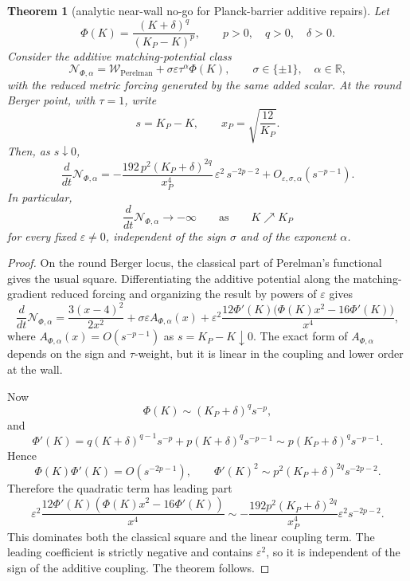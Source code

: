\documentclass[11pt]{amsart}
\newtheorem{theorem}{Theorem}
\newcommand{\KP}{K_{\!P}}
\newcommand{\Wcal}{\mathcal W}
\newcommand{\Ncal}{\mathcal N}
\begin{document}
\begin{theorem}[analytic near-wall no-go for Planck-barrier additive repairs]
Let
\[
        \Phi(K)=\frac{(K+\delta)^q}{(\KP-K)^p},
        \qquad
        p>0,\quad q>0,\quad \delta>0 .
\]
Consider the additive matching-potential class
\[
        \Ncal_{\Phi,\alpha}
        =
        \Wcal_{\mathrm{Perelman}}
        +
        \sigma\varepsilon\tau^\alpha \Phi(K),
        \qquad
        \sigma\in\{\pm1\},\quad \alpha\in\mathbb R,
\]
with the reduced metric forcing generated by the same added scalar.  At the
round Berger point, with \(\tau=1\), write
\[
        s=\KP-K,\qquad x_P=\sqrt{\frac{12}{\KP}} .
\]
Then, as \(s\downarrow0\),
\[
\boxed{
        \frac{d}{dt}\Ncal_{\Phi,\alpha}
        =
        -\frac{192\,p^2(\KP+\delta)^{2q}}{x_P^4}
        \,\varepsilon^2\,s^{-2p-2}
        +
        O_{\varepsilon,\sigma,\alpha}(s^{-p-1}) .
}
\]
In particular,
\[
        \frac{d}{dt}\Ncal_{\Phi,\alpha}\longrightarrow -\infty
        \qquad\text{as}\qquad K\nearrow\KP
\]
for every fixed \(\varepsilon\ne0\), independent of the sign \(\sigma\) and of
the exponent \(\alpha\).
\end{theorem}

\begin{proof}
On the round Berger locus, the classical part of Perelman's functional gives
the usual square.  Differentiating the additive potential along the
matching-gradient reduced forcing and organizing the result by powers of
\(\varepsilon\) gives
\[
        \frac{d}{dt}\Ncal_{\Phi,\alpha}
        =
        \frac{3(x-4)^2}{2x^2}
        +
        \sigma\varepsilon A_{\Phi,\alpha}(x)
        +
        \varepsilon^2
        \frac{12\Phi'(K)\bigl(\Phi(K)x^2-16\Phi'(K)\bigr)}{x^4},
\]
where \(A_{\Phi,\alpha}(x)=O(s^{-p-1})\) as \(s=\KP-K\downarrow0\).  The exact
form of \(A_{\Phi,\alpha}\) depends on the sign and \(\tau\)-weight, but it is
linear in the coupling and lower order at the wall.

Now
\[
        \Phi(K)\sim(\KP+\delta)^q s^{-p},
\]
and
\[
        \Phi'(K)
        =
        q(K+\delta)^{q-1}s^{-p}
        +
        p(K+\delta)^q s^{-p-1}
        \sim
        p(\KP+\delta)^q s^{-p-1}.
\]
Hence
\[
        \Phi(K)\Phi'(K)=O(s^{-2p-1}),
        \qquad
        \Phi'(K)^2
        \sim
        p^2(\KP+\delta)^{2q}s^{-2p-2}.
\]
Therefore the quadratic term has leading part
\[
        \varepsilon^2
        \frac{12\Phi'(K)(\Phi(K)x^2-16\Phi'(K))}{x^4}
        \sim
        -\frac{192p^2(\KP+\delta)^{2q}}{x_P^4}
        \varepsilon^2s^{-2p-2}.
\]
This dominates both the classical square and the linear coupling term.  The
leading coefficient is strictly negative and contains \(\varepsilon^2\), so it
is independent of the sign of the additive coupling.  The theorem follows.
\end{proof}
\end{document}
